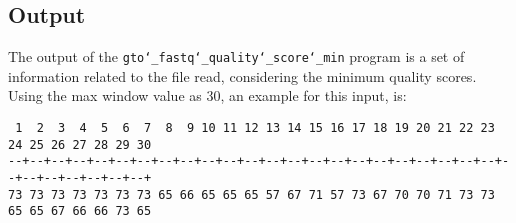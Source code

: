 \subsection*{Output}
The output of the \texttt{gto\char`_fastq\char`_quality\char`_score\char`_min} program is a set of information related to the file read, considering the minimum quality scores.  \\
Using the max window value as 30, an example for this input, is: 
\begin{lstlisting}
 1  2  3  4  5  6  7  8  9 10 11 12 13 14 15 16 17 18 19 20 21 22 23 24 25 26 27 28 29 30 
--+--+--+--+--+--+--+--+--+--+--+--+--+--+--+--+--+--+--+--+--+--+--+--+--+--+--+--+--+--+
73 73 73 73 73 73 73 65 66 65 65 65 57 67 71 57 73 67 70 70 71 73 73 65 65 67 66 66 73 65 
\end{lstlisting}